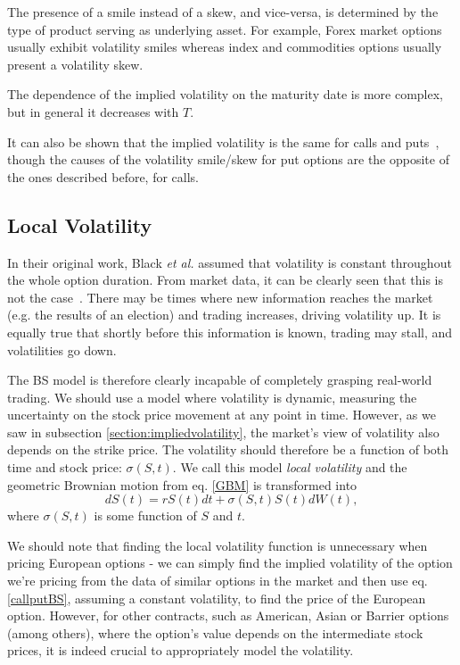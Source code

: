 The presence of a smile instead of a skew, and vice-versa, is determined by the type of product serving as underlying asset. For example, Forex market options usually exhibit volatility smiles whereas index and commodities options usually present a volatility skew.

The dependence of the implied volatility on the maturity date is more complex, but in general it decreases with $T$.

It can also be shown that the implied volatility is the same for calls and puts~\cite{Hull}, though the causes of the volatility smile/skew for put options are the opposite of the ones described before, for calls.

\subsection{Local Volatility}
\label{subsection:localvolatility}
In their original work, Black \textit{et al.} assumed that volatility is constant throughout the whole option duration. From market data, it can be clearly seen that this is not the case~\cite{DJIA}. There may be times where new information reaches the market  (e.g. the results of an election) and trading increases, driving volatility up. It is equally true that shortly before this information is known, trading may stall, and volatilities go down. 

The BS model is therefore clearly incapable of completely grasping real-world trading. We should use a model where volatility is dynamic, measuring the uncertainty on the stock price movement at any point in time.
However, as we saw in subsection \ref{section:impliedvolatility}, the market's view of volatility also depends on the strike price.
The volatility should therefore be a function of both time and stock price: $\sigma(S,t)$. We call this model \emph{local volatility} and the geometric Brownian motion from eq. \ref{GBM} is transformed into
\begin{equation}\label{GBM2}
dS(t)=rS(t)dt+\sigma(S,t)S(t)dW(t),
\end{equation}
\noindent where $\sigma(S,t)$ is some function of $S$ and $t$.


We should note that finding the local volatility function is unnecessary when pricing European options - we can simply find the implied volatility of the option we're pricing from the data of similar options in the market and then use eq.\eqref{callputBS}, assuming a constant volatility, to find the price of the European option.
However, for other contracts, such as American, Asian or Barrier options (among others), where the option's value depends on the intermediate stock prices, it is indeed crucial to appropriately model the volatility.

